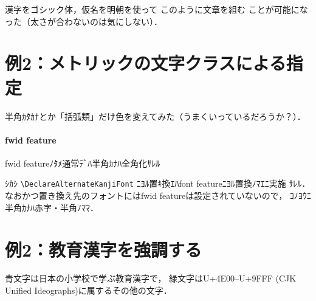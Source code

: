 \documentclass{ltjsarticle}
\begin{document}


{\Large\gt 
漢字をゴシック体，仮名を明朝を使って
{\selectfont このように文章を組む}
ことが可能になった（太さが合わないのは気にしない）．}

\section{例2：メトリックの文字クラスによる指定}


{\selectfont
半角ｶﾀｶﾅとか「括弧類」だけ色を変えてみた（うまくいっているだろうか？）．
}

\paragraph{fwid feature}

{\selectfont
fwid featureﾉﾀﾒ通常ﾃﾞﾊ半角ｶﾅﾊ全角化ｻﾚﾙ

\selectfont
ｼｶｼ \verb+\DeclareAlternateKanjiFont+ ﾆﾖﾙ置ｷ換ｴﾊfont featureﾆﾖﾙ置換ﾉﾏｴﾆ実施
ｻﾚﾙ．なおかつ置き換え先のフォントにはfwid featureは設定されていないので，
ｺﾉﾖｳﾆ半角ｶﾅﾊ赤字・半角ﾉﾏﾏ．
}


\newpage
\section{例2：教育漢字を強調する}
青文字は日本の小学校で学ぶ教育漢字で，
緑文字はU+4E00--U+9FFF (CJK Unified Ideographs)に属するその他の文字．
\end{document}
